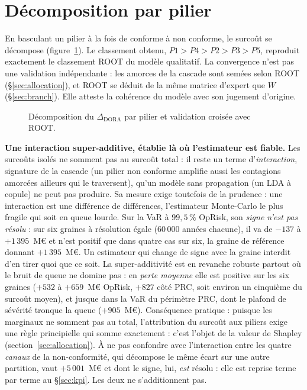 \section{Décomposition par pilier}

En basculant un pilier à la fois de conforme à non conforme, le surcoût se décompose
(figure~\ref{fig:decomp}). Le classement obtenu, $P1>P4>P2>P3>P5$, reproduit exactement
le classement ROOT du modèle qualitatif. La convergence n'est pas une validation
indépendante : les amorces de la cascade sont semées selon ROOT (\S\ref{sec:allocation}), et ROOT
se déduit de la même matrice d'expert que $W$ (\S\ref{sec:branch}). Elle atteste la cohérence
du modèle avec son jugement d'origine.

\begin{figure}[htbp]\centering
{}
\caption{Décomposition du $\Delta_{\text{DORA}}$ par pilier et validation croisée avec ROOT.
}
\label{fig:decomp}
\end{figure}

\begin{cle}
\textbf{Une interaction super-additive, établie là où l'estimateur est fiable.} Les surcoûts
isolés ne somment pas au surcoût total : il reste un terme d'\emph{interaction}, signature de la
cascade (un pilier non conforme amplifie aussi les contagions amorcées ailleurs qui le
traversent), qu'un modèle sans propagation (un LDA à copule) ne peut pas produire.
Sa mesure exige toutefois de la prudence : une interaction est une différence de différences,
l'estimateur Monte-Carlo le plus fragile qui soit en queue lourde. Sur la VaR à $99{,}5\,\%$
OpRisk, son \emph{signe n'est pas résolu} : sur six graines à résolution égale
($60\,000$ années chacune), il va de $-137$ à $+1\,395$~M\euro{} et n'est positif que dans
quatre cas sur six, la graine de référence donnant $+1\,395$~M\euro{}. Un estimateur
qui change de signe avec la graine interdit d'en tirer quoi que ce soit. La super-additivité
est en revanche robuste partout où le bruit de queue ne domine pas : en \emph{perte moyenne}
elle est positive sur les six graines ($+532$ à $+659$~M\euro{} OpRisk, $+827$
côté PRC, soit environ un cinquième du surcoût moyen), et jusque dans la VaR du périmètre PRC,
dont le plafond de sévérité tronque la queue ($+905$~M\euro{}). Conséquence pratique : puisque les
marginaux ne somment pas au total, l'attribution du surcoût aux piliers exige une règle
principielle qui somme exactement : c'est l'objet de la valeur de Shapley
(section~\ref{sec:allocation}). À ne pas confondre avec l'interaction entre les quatre
\emph{canaux} de la non-conformité, qui décompose le même écart sur une autre partition, vaut
$+5\,001$~M\euro{} et dont le signe, lui, \emph{est} résolu : elle est reprise terme par terme au
\S\ref{sec:kpi}. Les deux ne s'additionnent pas.
\end{cle}

